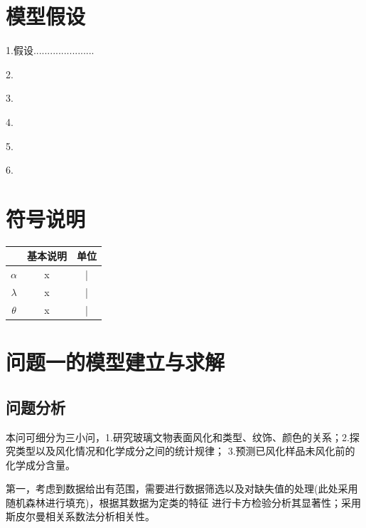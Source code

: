 \documentclass[UTF8]{ctexart}
\begin{document}
\section{模型假设}
1.假设......................

2.

3.

4.

5.

6.

\section{符号说明}


		\begin{table}[H] 
		\begin{center}  
		\begin{tabular}{c|c|c}    
		\toprule[2pt]    
		\rowcolor[gray]{0.8}

		\multicolumn{1}{m{8em}}{\centering 符号}  &\multicolumn{1}{m{15em}}{\centering 基本说明} &\multicolumn{1}{m{10em}}{\centering 单位}\\


		\midrule[1.3pt]
		    $\alpha$                                & x        & | \\
			$\lambda$                                & x        & |       \\
			$\theta$                                 & x        & |            \\


		\bottomrule[2pt]   
		\end{tabular}  
		\end{center}
		\end{table}




\section{问题一的模型建立与求解}
\subsection{问题分析}
本问可细分为三小问，1.研究玻璃文物表面风化和类型、纹饰、颜色的关系；2.探究类型以及风化情况和化学成分之间的统计规律；
3.预测已风化样品未风化前的化学成分含量。

第一，考虑到数据给出有范围，需要进行数据筛选以及对缺失值的处理(此处采用随机森林进行填充)，根据其数据为定类的特征
进行卡方检验分析其显著性；采用斯皮尔曼相关系数法分析相关性。
\end{document}
